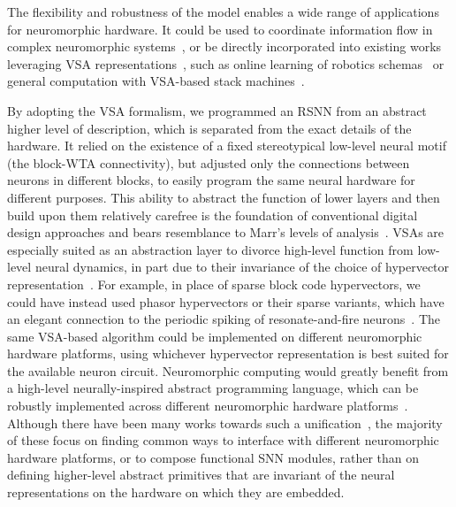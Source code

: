 The flexibility and robustness of the model enables a wide range of applications for neuromorphic hardware. It could be used to coordinate information flow in complex neuromorphic systems~\cite{baumgartner_visual_2020}, or be directly incorporated into existing works leveraging VSA representations~\cite{kleyko_survey_2023}, such as online learning of robotics schemas~\cite{neubert_introduction_2019} or general computation with VSA-based stack machines~\cite{yerxa_hyperdimensional_2018, kleyko_vector_2022}.


By adopting the VSA formalism, we programmed an RSNN from an abstract higher level of description, which is separated from the exact details of the hardware. It relied on the existence of a fixed stereotypical low-level neural motif (the block-WTA connectivity), but adjusted only the connections between neurons in different blocks, to easily program the same neural hardware for different purposes.
This ability to abstract the function of lower layers and then build upon them relatively carefree is the foundation of conventional digital design approaches and bears resemblance to Marr's levels of analysis~\cite{marr_vision_1982, kleyko_vector_2022}. VSAs are especially suited as an abstraction layer to divorce high-level function from low-level neural dynamics, in part due to their invariance of the choice of hypervector representation~\cite{kleyko_vector_2022, kleyko_survey_2022}. For example, in place of sparse block code hypervectors, we could have instead used phasor hypervectors \cite{noest_phasor_1987, plate_holographic_1995} or their sparse variants, which have an elegant connection to the periodic spiking of resonate-and-fire neurons~\cite{frady_robust_2019,renner_neuromorphic_2022}. The same VSA-based algorithm could be implemented on different neuromorphic hardware platforms, using whichever hypervector representation is best suited for the available neuron circuit.
Neuromorphic computing would greatly benefit from a high-level neurally-inspired abstract programming language, which can be robustly implemented across different neuromorphic hardware platforms~\cite{schuman_opportunities_2022, kleyko_vector_2022, jaeger_toward_2023}.
Although there have been many works towards such a unification~\cite{stefanini_pyncs_2014, davison_pynn_2009, aimone_composing_2019, zhang_system_2020, eliasmith_unified_2005}, the majority of these focus on finding common ways to interface with different neuromorphic hardware platforms, or to compose functional SNN modules, rather than on defining higher-level abstract primitives that are invariant of the neural representations on the hardware on which they are embedded. 




